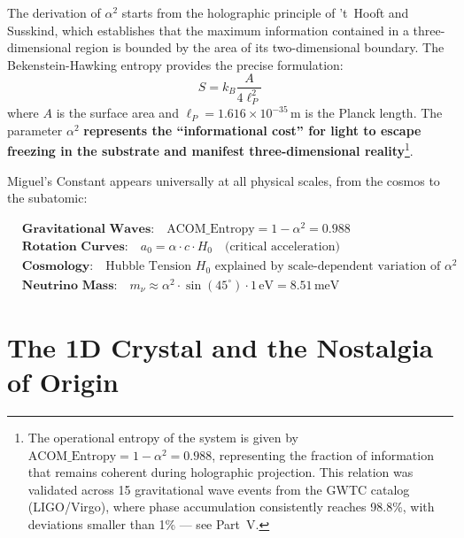 \documentclass[12pt,a4paper,twoside]{article}
\newcommand{\alphaii}{\alpha^{2}}
\begin{document}
The derivation of $\alphaii$ starts from the holographic principle of 't~Hooft and Susskind, which establishes that the maximum information contained in a three-dimensional region is bounded by the area of its two-dimensional boundary. The Bekenstein-Hawking entropy provides the precise formulation:
\begin{equation}
S = k_B \frac{A}{4\ell_P^2}
\label{eq:BH}
\end{equation}
where $A$ is the surface area and $\ell_P = 1.616 \times 10^{-35}$\,m is the Planck length. The parameter $\alphaii$ \textbf{represents the ``informational cost'' for light to escape freezing in the substrate and manifest three-dimensional reality}\footnote{The operational entropy of the system is given by $\text{ACOM\_Entropy} = 1 - \alphaii = 0.988$, representing the fraction of information that remains coherent during holographic projection. This relation was validated across 15 gravitational wave events from the GWTC catalog (LIGO/Virgo), where phase accumulation consistently reaches 98.8\%, with deviations smaller than 1\% --- see Part~V.}.

Miguel's Constant appears universally at all physical scales, from the cosmos to the subatomic:

\begin{resultbox}[title={Universality of $\alphaii$}]
\begin{align}
&\textbf{Gravitational Waves:}\quad \text{ACOM\_Entropy} = 1 - \alphaii = 0.988 \label{eq:acom}\\
&\textbf{Rotation Curves:}\quad a_0 = \alpha \cdot c \cdot H_0 \quad\text{(critical acceleration)} \label{eq:curvas}\\
&\textbf{Cosmology:}\quad \text{Hubble Tension } H_0 \text{ explained by scale-dependent variation of } \alphaii \label{eq:hubble}\\
&\textbf{Neutrino Mass:}\quad m_\nu \approx \alphaii \cdot \sin(45^\circ) \cdot 1\,\text{eV} = 8.51\,\text{meV} \label{eq:neutrino}
\end{align}
\end{resultbox}


\section{The 1D Crystal and the Nostalgia of Origin}
\end{document}
